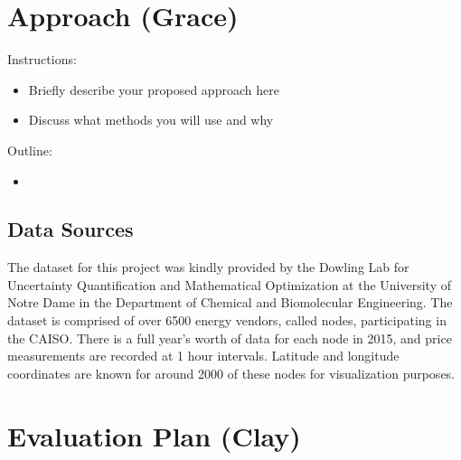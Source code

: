 \documentclass[sigconf]{acmart}
\begin{document}

\section{Approach (Grace)}
Instructions:
\begin{itemize}
    \item Briefly describe your proposed approach here
    \item Discuss what methods you will use and why
\end{itemize}

Outline:
\begin{itemize}
	\item 
\end{itemize}


\subsection{Data Sources}
The dataset for this project was kindly provided by the Dowling Lab for Uncertainty Quantification and Mathematical Optimization at the University of Notre Dame in the Department of Chemical and Biomolecular Engineering. The dataset is comprised of over 6500 energy vendors, called nodes, participating in the CAISO. There is a full year's worth of data for each node in 2015, and price measurements are recorded at 1 hour intervals. Latitude and longitude coordinates are known for around 2000 of these nodes for visualization purposes.


\section{Evaluation Plan (Clay)}
\end{document}
